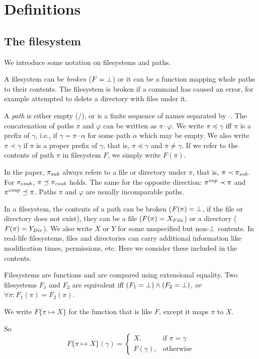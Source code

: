 \section{Definitions}
\label{theorem:def}
\subsection{The filesystem}
We introduce some notation on filesystems and paths.

A filesystem can be \emph{broken} (\(F=\bot\))
or it can be a function mapping whole paths to their
contents. The filesystem is broken if a command has caused an error, for
example attempted to delete a directory with files under it.

A \emph{path} is either empty (/), or is a finite sequence of names
separated by \(\cdot\). The concatenation of paths \(\pi\) and
\(\varphi\) can be written as \(\pi\cdot\varphi\).
We write
\(\pi\preceq\gamma\) iff \(\pi\) is a prefix of \(\gamma\), i.e., if
\(\gamma=\pi\cdot\alpha\) for some path \(\alpha\) which may be
empty. We also write
\(\pi\prec\gamma\) if \(\pi\) is a proper prefix of \(\gamma\), that is,
\(\pi\preceq\gamma\) and \(\pi\ne\gamma\). If we refer to the contents of
path \(\pi\) in filesystem \(F\), we simply write \(F(\pi)\).

In the paper, \(\pi_{sub}\) always refers to a file or directory under
\(\pi\), that is, \(\pi\prec\pi_{sub}\). For \(\pi_{\varepsilon sub}\),
\(\pi\preceq\pi_{\varepsilon sub}\) holds. The same for the opposite direction:
\(\pi^{sup}\prec\pi\) and \(\pi^{\varepsilon sup}\preceq\pi\). Paths \(\pi\) and
\(\varphi\) are usually incomparable paths.

In a filesystem, the contents of a path can be broken (\(F(\pi)=\bot\),
if the file or directory does not exist), they can be
a file (\(F(\pi)=X_{File}\)) or a directory (\(F(\pi)=Y_{Dir}\)).  
We also write \(X\) or \(Y\) for some unspecified but non-\(\bot\)
contents.
In real-life filesystems, files and directories can carry additional information
like modification times, permissions, etc.
Here we consider these included in the contents. 

Filesystems are functions and are compared using extensional equality.
Two filesystems \(F_1\) and \(F_2\) are equivalent iff
\((F_1=\bot)\wedge(F_2=\bot)\),
\emph{or} \(\forall\pi: F_1(\pi)=F_2(\pi)\).

We write \(F\{\pi \mapsto X\}\) for the function that is like \(F\),
except it maps \(\pi\) to \(X\).
\begin{notrsi}
So
\[F\{\pi \mapsto X\}(\gamma)=
\begin{cases}
X,&\mbox{if $\pi=\gamma$}\\
F(\gamma), &\mbox{otherwise}
\end{cases}\]
\end{notrsi}


